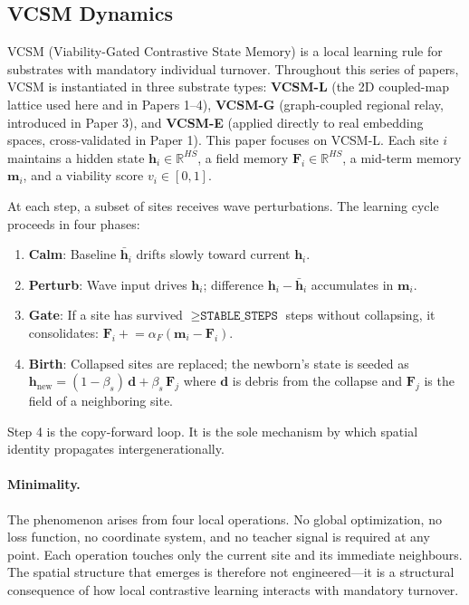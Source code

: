 \documentclass[11pt,twocolumn]{article}
\begin{document}
\subsection{VCSM Dynamics}

VCSM (Viability-Gated Contrastive State Memory) is a local learning rule for substrates with mandatory individual turnover. Throughout this series of papers, VCSM is instantiated in three substrate types: \textbf{VCSM-L} (the 2D coupled-map lattice used here and in Papers 1--4), \textbf{VCSM-G} (graph-coupled regional relay, introduced in Paper 3), and \textbf{VCSM-E} (applied directly to real embedding spaces, cross-validated in Paper 1). This paper focuses on VCSM-L.
Each site $i$ maintains a hidden state $\mathbf{h}_i \in \mathbb{R}^{HS}$,
a field memory $\mathbf{F}_i \in \mathbb{R}^{HS}$, a mid-term memory
$\mathbf{m}_i$, and a viability score $v_i \in [0,1]$.

At each step, a subset of sites receives wave perturbations. The learning cycle
proceeds in four phases:
\begin{enumerate}
  \item \textbf{Calm}: Baseline $\bar{\mathbf{h}}_i$ drifts slowly toward current $\mathbf{h}_i$.
  \item \textbf{Perturb}: Wave input drives $\mathbf{h}_i$; difference
        $\mathbf{h}_i - \bar{\mathbf{h}}_i$ accumulates in $\mathbf{m}_i$.
  \item \textbf{Gate}: If a site has survived $\geq \texttt{STABLE\_STEPS}$
        steps without collapsing, it consolidates:
        $\mathbf{F}_i \mathrel{+}= \alpha_F (\mathbf{m}_i - \mathbf{F}_i)$.
  \item \textbf{Birth}: Collapsed sites are replaced; the newborn's state is
        seeded as $\mathbf{h}_\text{new} = (1 - \beta_s)\,\mathbf{d} + \beta_s\,\mathbf{F}_j$
        where $\mathbf{d}$ is debris from the collapse and $\mathbf{F}_j$ is
        the field of a neighboring site.
\end{enumerate}

Step 4 is the copy-forward loop. It is the sole mechanism by which spatial identity
propagates intergenerationally.

\paragraph{Minimality.}
The phenomenon arises from four local operations.
No global optimization, no loss function, no coordinate system, and no
teacher signal is required at any point.
Each operation touches only the current site and its immediate neighbours.
The spatial structure that emerges is therefore not engineered---it is a
structural consequence of how local contrastive learning interacts with
mandatory turnover.
\end{document}
